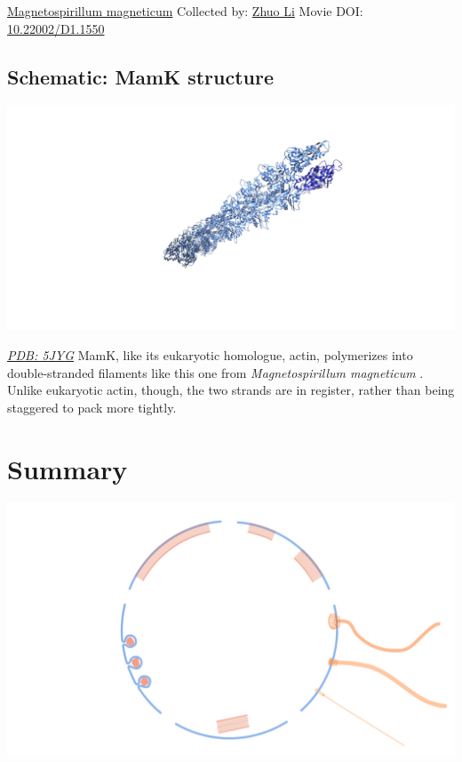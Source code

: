 \documentclass[]{tufte-book}
\begin{document}
\hypertarget{htmlwidget-c8795757cebe010cecfe}{}

\label{fig:7-6}\protect\hyperlink{tree}{Magnetospirillum magneticum} Collected by: \protect\hyperlink{zhuo_li}{Zhuo Li} Movie DOI: \href{https://doi.org/10.22002/D1.1550}{10.22002/D1.1550}

\hypertarget{MamK_structure}{%
\subsection*{Schematic: MamK structure}\label{MamK_structure}}

\includegraphics{img/schematics/7_6_1}

\href{http://rcsb.org/structure/5JYG}{\emph{PDB: 5JYG}}
MamK, like its eukaryotic homologue, actin, polymerizes into double-stranded filaments like this one from \emph{Magnetospirillum magneticum} \citep{bergeron2017}. Unlike eukaryotic actin, though, the two strands are in register, rather than being staggered to pack more tightly.

\hypertarget{summary-6}{%
\section{Summary}\label{summary-6}}

\includegraphics{img/summaries/07_Navigation}
\end{document}
